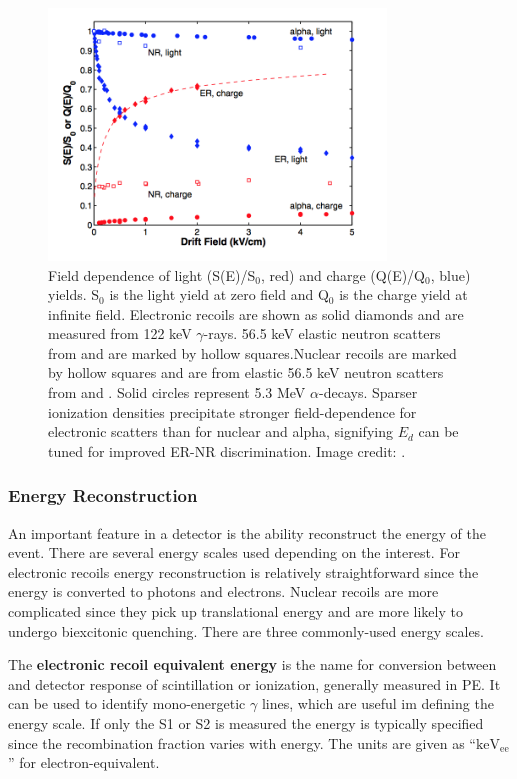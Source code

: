 \begin{figure}
\centering
\includegraphics[width=0.8\textwidth]{LYQY}
\caption{Field dependence of light (S(E)/S$_{0}$, red) and charge (Q(E)/Q$_{0}$, blue) yields.  S$_{0}$ is the light yield at zero field
and Q$_{0}$ is the charge yield at
infinite field.  Electronic recoils are shown as solid diamonds and are measured from  122 keV $\gamma$-rays.  56.5
keV elastic neutron scatters from \ambe and  are marked by hollow squares.Nuclear recoils
are marked by hollow squares and are from elastic 56.5 keV neutron scatters from \ambe and .  Solid circles represent 
5.3 MeV $\alpha$-decays.  Sparser ionization densities precipitate stronger field-dependence for electronic scatters than for nuclear and
alpha, signifying $E_{d}$ can be tuned for improved ER-NR discrimination.  Image credit: .}
\label{fig:tpcs_signals_drift_field}
\end{figure}



\subsubsection{Energy Reconstruction}
\label{subsubsec:tpcs_signals_energy}
An important feature in a detector is the ability reconstruct the energy of the event.  There are several energy scales used
depending on the interest.  For electronic recoils energy
reconstruction is relatively straightforward since the energy is converted to photons and electrons.  Nuclear recoils are more
complicated since they pick up translational energy and are more likely to undergo biexcitonic quenching.  There are three commonly-used
energy scales.

The \textbf{electronic recoil equivalent energy} is the name for conversion between \gammaray and detector response of scintillation or
ionization, generally measured in PE.  It can be used to identify mono-energetic $\gamma$ lines, which are useful im defining the energy
scale.  If only the S1 or S2 is measured the energy is typically specified since the recombination fraction varies with energy.  The units
are given as ``$\mathrm{keV_{ee}}$'' for electron-equivalent.

